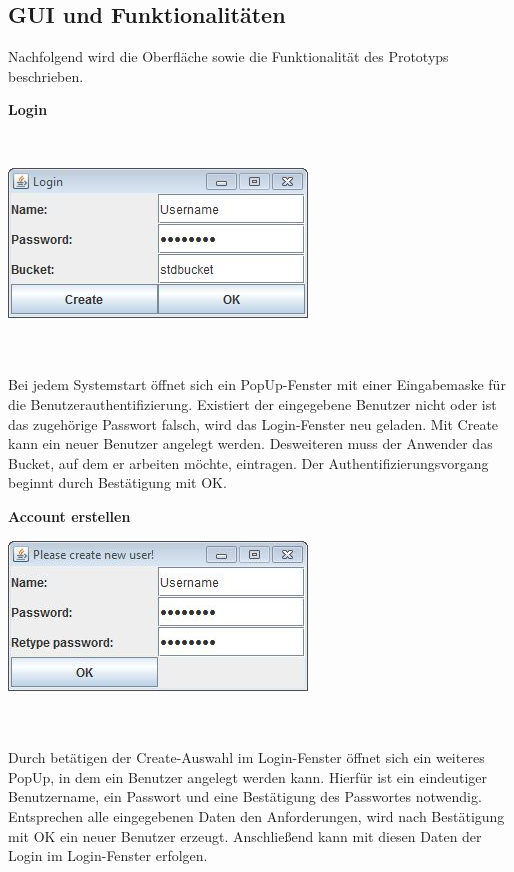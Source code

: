 \documentclass[12pt,a4paper,bibliography=totocnumbered,listof=totocnumbered]{scrartcl}
\begin{document}
\subsection{GUI und Funktionalitäten}
Nachfolgend wird die Oberfläche sowie die Funktionalität des Prototyps beschrieben.

\textbf{Login}

\vspace{1em}
$\;$\\
\begin{minipage}{\linewidth}
	\centering
	\includegraphics[width=0.4\linewidth]{Login.jpg}
	\label{Login}
\end{minipage}
\\\\Bei jedem Systemstart öffnet sich ein PopUp-Fenster mit einer Eingabemaske für die Benutzerauthentifizierung. Existiert der eingegebene Benutzer nicht oder ist das zugehörige Passwort falsch, wird das Login-Fenster neu geladen. Mit Create kann ein neuer Benutzer angelegt werden. Desweiteren muss der Anwender das Bucket, auf dem er arbeiten möchte, eintragen. Der Authentifizierungsvorgang beginnt durch Bestätigung mit OK.

\textbf{Account erstellen}
\vspace{1em}
$\;$\\
\begin{minipage}{\linewidth}
	\centering
	\includegraphics[width=0.4\linewidth]{Create.jpg}
	\label{Create}
\end{minipage}
\\\\Durch betätigen der Create-Auswahl im Login-Fenster öffnet sich ein weiteres PopUp, in dem ein Benutzer angelegt werden kann. Hierfür ist ein eindeutiger Benutzername, ein Passwort und eine Bestätigung des Passwortes notwendig. Entsprechen alle eingegebenen Daten den Anforderungen, wird nach Bestätigung mit OK ein neuer Benutzer erzeugt. Anschließend kann mit diesen Daten der Login im Login-Fenster erfolgen.
\end{document}

